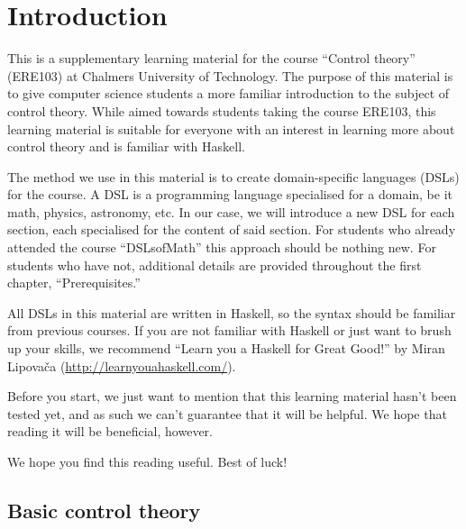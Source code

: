 \section{Introduction}

This is a supplementary learning material for the course ``Control theory'' (ERE103) at Chalmers University of Technology. The purpose of this material is to give computer science students a more familiar introduction to the subject of control theory. While aimed towards students taking the course ERE103, this learning material is suitable for everyone with an interest in learning more about control theory and is familiar with Haskell. 

The method we use in this material is to create domain-specific languages (DSLs) for the course. A DSL is a programming language specialised for a domain, be it math, physics, astronomy, etc. In our case, we will introduce a new DSL for each section, each specialised for the content of said section. For students who already attended the course ``DSLsofMath'' this approach should be nothing new. For students who have not, additional details are provided throughout the first chapter, ``Prerequisites.''

All DSLs in this material are written in Haskell, so the syntax should be familiar from previous courses. If you are not familiar with Haskell or just want to brush up your skills, we recommend ``Learn you a Haskell for Great Good!'' by Miran Lipovača (\href{http://learnyouahaskell.com/}{http://learnyouahaskell.com/}). 

\begin{newtext}
Before you start, we just want to mention that this learning material hasn't been tested yet, and as such we can't guarantee that it will be helpful. We hope that reading it will be beneficial, however. 
\end{newtext}
We hope you find this reading useful. Best of luck!



\subsection{Basic control theory}

